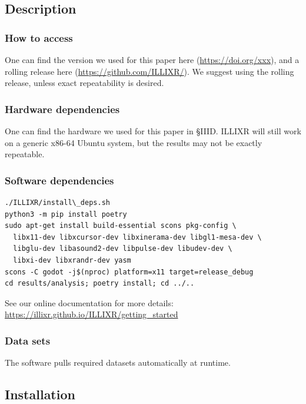 \documentclass{sigplanconf}
\newcommand{\zenodo}{\footnotesize \url{https://doi.org/xxx}}
\begin{document}
\subsection{Description}

\subsubsection{How to access}

One can find the version we used for this paper here (\zenodo), and a rolling release here ({\footnotesize \url{https://github.com/ILLIXR/}}). We suggest using the rolling release, unless exact repeatability is desired.

\subsubsection{Hardware dependencies}

One can find the hardware we used for this paper in \S IIID. ILLIXR will still work on a generic x86-64 Ubuntu system, but the results may not be exactly repeatable.

\subsubsection{Software dependencies}

{
\footnotesize
\begin{verbatim}
./ILLIXR/install\_deps.sh
python3 -m pip install poetry
sudo apt-get install build-essential scons pkg-config \
  libx11-dev libxcursor-dev libxinerama-dev libgl1-mesa-dev \
  libglu-dev libasound2-dev libpulse-dev libudev-dev \
  libxi-dev libxrandr-dev yasm
scons -C godot -j$(nproc) platform=x11 target=release_debug
cd results/analysis; poetry install; cd ../..
\end{verbatim}
}

See our online documentation for more details:\newline
{\footnotesize \url{https://illixr.github.io/ILLIXR/getting_started}}

\subsubsection{Data sets}

The software pulls required datasets automatically at runtime.

\subsection{Installation}
\end{document}
